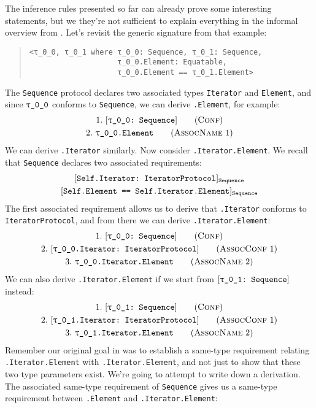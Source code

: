 \documentclass[../generics]{subfiles}
\begin{document}
\begin{example}\label{motivating derived equiv}
The inference rules presented so far can already prove some interesting statements, but we they're not sufficient to explain everything in the informal overview from . Let's revisit the generic signature from that example:
\begin{quote}
\begin{verbatim}
<τ_0_0, τ_0_1 where τ_0_0: Sequence, τ_0_1: Sequence,
                    τ_0_0.Element: Equatable,
                    τ_0_0.Element == τ_0_1.Element>
\end{verbatim}
\end{quote}
The \texttt{Sequence} protocol declares two associated types \texttt{Iterator} and \texttt{Element}, and since $\rT$ conforms to \texttt{Sequence}, we can derive \texttt{\rT.Element}, for example:
\begin{gather*}
\ConfStep{\rT}{Sequence}{1}\\
\AssocNameStep{1}{\rT.Element}{2}
\end{gather*}
We can derive \texttt{\rT.Iterator} similarly. Now consider \texttt{\rT.Iterator.Element}. We recall that \texttt{Sequence} declares two associated requirements:
\begin{gather*}
\AssocConfReq{Self.Iterator}{IteratorProtocol}{Sequence}\\
\AssocSameReq{Self.Element}{Self.Iterator.Element}{Sequence}
\end{gather*}
The first associated requirement allows us to derive that \texttt{\rT.Iterator} conforms to \texttt{IteratorProtocol}, and from there we can derive \texttt{\rT.Iterator.Element}:
\begin{gather*}
\ConfStep{\rT}{Sequence}{1}\\
\AssocConfStep{1}{\rT.Iterator}{IteratorProtocol}{2}\\
\AssocNameStep{2}{\rT.Iterator.Element}{3}
\end{gather*}
We can also derive \texttt{\rU.Iterator.Element} if we start from $\ConfReq{\rU}{Sequence}$ instead:
\begin{gather*}
\ConfStep{\rU}{Sequence}{1}\\
\AssocConfStep{1}{\rU.Iterator}{IteratorProtocol}{2}\\
\AssocNameStep{2}{\rU.Iterator.Element}{3}
\end{gather*}
Remember our original goal in  was to establish a same-type requirement relating \texttt{\rT.Iterator.Element} with \texttt{\rU.Iterator.Element}, and not just to show that these two type parameters exist. We're going to attempt to write down a derivation. The associated same-type requirement of \texttt{Sequence} gives us a same-type requirement between \texttt{\rT.Element} and \texttt{\rT.Iterator.Element}:

\end{example}
\end{document}
